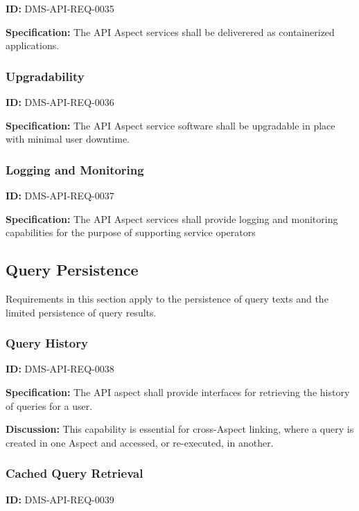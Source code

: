 \documentclass[SE,toc,lsstdraft]{lsstdoc}
\begin{document}
\label{DMS-API-REQ-0035}
\textbf{ID:} DMS-API-REQ-0035

\textbf{Specification:}
The API Aspect services shall be deliverered as containerized applications.

\subsubsection{Upgradability}

\label{DMS-API-REQ-0036}
\textbf{ID:} DMS-API-REQ-0036

\textbf{Specification:}
The API Aspect service software shall be upgradable in place with minimal user downtime.

\subsubsection{Logging and Monitoring}

\label{DMS-API-REQ-0037}
\textbf{ID:} DMS-API-REQ-0037

\textbf{Specification:}
The API Aspect services shall provide logging and monitoring capabilities for the purpose of supporting service operators

\subsection{Query Persistence}

Requirements in this section apply to the persistence of query texts and the limited persistence of query results.

\subsubsection{Query History}

\label{DMS-API-REQ-0038}
\textbf{ID:} DMS-API-REQ-0038

\textbf{Specification:}
The API aspect shall provide interfaces for retrieving the history of queries for a user.

\textbf{Discussion:}
This capability is essential for cross-Aspect linking, where a query is created in one Aspect and accessed, or re-executed, in another.

\subsubsection{Cached Query Retrieval}

\label{DMS-API-REQ-0039}
\textbf{ID:} DMS-API-REQ-0039
\end{document}
